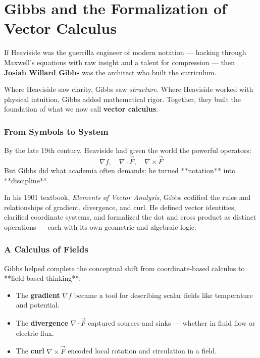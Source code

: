 \section{Gibbs and the Formalization of Vector Calculus}

If Heaviside was the guerrilla engineer of modern notation — hacking through Maxwell’s equations with raw insight and a talent for compression — then \textbf{Josiah Willard Gibbs} was the architect who built the curriculum.

Where Heaviside saw clarity, Gibbs saw \emph{structure}.  
Where Heaviside worked with physical intuition, Gibbs added mathematical rigor.  
Together, they built the foundation of what we now call \textbf{vector calculus}.

\subsubsection*{From Symbols to System}

By the late 19th century, Heaviside had given the world the powerful operators:
\[
\nabla f, \quad \nabla \cdot \vec{F}, \quad \nabla \times \vec{F}
\]
But Gibbs did what academia often demands:  
he turned **notation** into **discipline**.

In his 1901 textbook, \emph{Elements of Vector Analysis}, Gibbs codified the rules and relationships of gradient, divergence, and curl. He defined vector identities, clarified coordinate systems, and formalized the dot and cross product as distinct operations — each with its own geometric and algebraic logic.

\subsubsection*{A Calculus of Fields}

Gibbs helped complete the conceptual shift from coordinate-based calculus to **field-based thinking**:

\begin{itemize}
    \item The \textbf{gradient} \( \nabla f \) became a tool for describing scalar fields like temperature and potential.
    \item The \textbf{divergence} \( \nabla \cdot \vec{F} \) captured sources and sinks — whether in fluid flow or electric flux.
    \item The \textbf{curl} \( \nabla \times \vec{F} \) encoded local rotation and circulation in a field.
\end{itemize}

